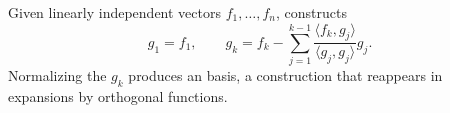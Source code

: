 Given linearly independent vectors $f_1,\ldots,f_n$,  constructs
\begin{equation}
g_1=f_1,
\qquad
g_k=f_k-\sum_{j=1}^{k-1}\frac{\langle f_k,g_j\rangle}{\langle g_j,g_j\rangle}g_j.
\end{equation}
Normalizing the $g_k$ produces an  basis, a construction that reappears in expansions by orthogonal functions.
